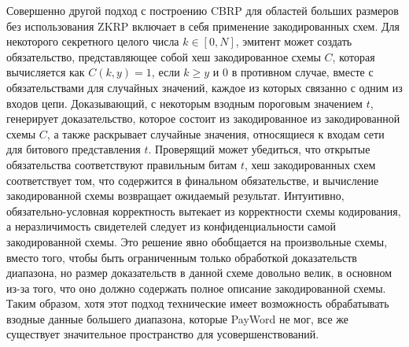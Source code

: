 Совершенно другой подход с построению CBRP для областей больших размеров без использования ZKRP включает в себя применение закодированных схем.
Для некоторого секретного целого числа $k \in [0, N]$, эмитент может создать обязательство, представляющее собой хеш закодированное схемы $C$, которая вычисляется как $C(k, y) = 1$, если $k \geq y$ и $0$ в противном случае, вместе с обязательствами для случайных значений, каждое из которых связанно с одним из входов цепи.
Доказывающий, с некоторым взодным пороговым значением $t$, генерирует доказательство, которое состоит из закодированное из закодированной схемы $C$, а также раскрывает случайные значения, относящиеся к входам сети для битового представления $t$.
Проверящий может убедиться, что открытые обязательства соответствуют правильным битам $t$, хеш закодированных схем соответствует том, что содержится в финальном обязательстве, и вычисление закодированной схемы возвращает ожидаемый результат.
Интуитивно, обязательно-условная корректность вытекает из корректности схемы кодирования, а неразличимость свидетелей следует из конфиденциальности самой закодированной схемы.
Это решение явно обобщается на произвольные схемы, вместо того, чтобы быть ограниченным только обработкой доказательств диапазона, но размер доказательств в данной схеме довольно велик, в основном из-за того, что оно должно содержать полное описание закодированной схемы.
Таким образом, хотя этот подход технические имеет возможность обрабатывать взодные данные большего диапазона, которые PayWord не мог, все же существует значительное пространство для усовершенствований.

